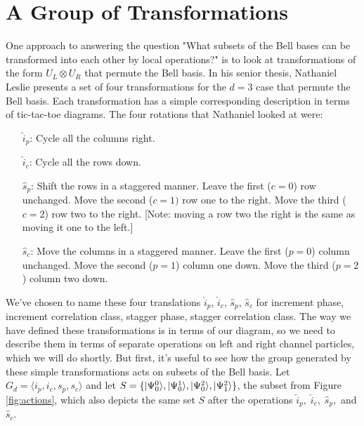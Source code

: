 \section{A Group of Transformations}

One approach to answering the question "What subsets of the Bell bases can be transformed into each other by local operations?" is to look at transformations of the form $U_L \otimes U_R$ that permute the Bell basis. In his senior thesis, Nathaniel Leslie presents a set of four transformations for the $d = 3$ case that permute the Bell basis. Each transformation has a simple corresponding description in terms of tic-tac-toe diagrams. The four rotations that Nathaniel looked at were:

\begin{enumerate}
  \item[$\hat{i}_p$:] Cycle all the columns right.
  \item[$\hat{i}_c$:] Cycle all the rows down.
  \item[$\hat{s}_p$:] Shift the rows in a staggered manner. Leave the first ($c = 0$) row unchanged. Move the second ($c = 1)$ row one to the right. Move the third ($c = 2$) row two to the right. [Note: moving a row two the right is the same as moving it one to the left.]
  \item[$\hat{s}_c$:] Move the columns in a staggered manner. Leave the first ($p = 0$) column unchanged. Move the second ($p = 1$) column one down. Move the third ($p = 2$) column two down.
\end{enumerate}

We've chosen to name these four translations $\hat{i}_p$, $\hat{i}_c$, $\hat{s}_p$, $\hat{s}_c$ for increment phase, increment correlation class, stagger phase, stagger correlation class. The way we have defined these transformations is in terms of our diagram, so we need to describe them in terms of separate operations on left and right channel particles, which we will do shortly. But first, it's useful to see how the group generated by these simple transformations acts on subsets of the Bell basis. Let $G_d = \langle i_p, i_c, s_p, s_c \rangle$ and let $S = \{| \Psi_0^0 \rangle, | \Psi_0^1 \rangle, | \Psi_0^2 \rangle, | \Psi_1^2 \rangle\}$, the subset from Figure \ref{fig:actions}, which also depicts the same set $S$ after the operations $\hat{i}_p,\; \hat{i}_c,\; \hat{s}_p,$ and $\hat{s}_c$.

